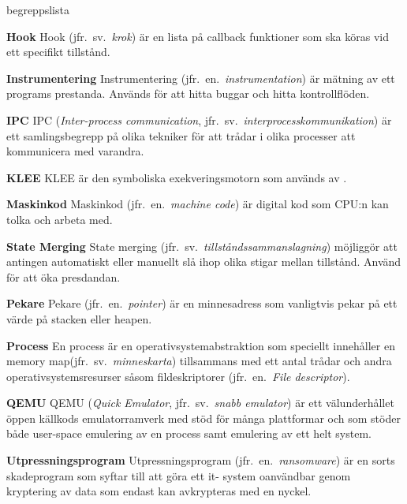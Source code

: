 \begin{labeling}{begreppslista}
    \item [\textbf{Hook}] Hook (jfr.\ sv.\ \emph{krok}) är en lista på callback
    funktioner som ska köras vid ett specifikt tillstånd.

    \item [\textbf{Instrumentering}] Instrumentering (jfr.\ en.\
    \emph{instrumentation}) är mätning av ett programs prestanda. Används för
    att hitta buggar och hitta kontrollflöden.

    \item [\textbf{IPC}] IPC (\emph{Inter-process communication}, jfr.\ sv.\
    \emph{interprocesskommunikation}) är ett samlingsbegrepp på olika tekniker
    för att trådar i olika processer att kommunicera med varandra.

    \item [\textbf{KLEE}] KLEE är den symboliska exekveringsmotorn som används
    av \stoe{}.

    \item [\textbf{Maskinkod}] Maskinkod (jfr.\ en.\ \emph{machine code}) är
    digital kod som CPU:n kan tolka och arbeta med.

    \item [\textbf{State Merging}] State merging (jfr.\ sv.\
    \emph{tillståndssammanslagning}) möjliggör att antingen automatiskt
    eller manuellt slå ihop olika stigar mellan tillstånd. Använd för att öka
    presdandan.

    \item [\textbf{Pekare}] Pekare (jfr.\ en.\ \emph{pointer}) är en minnesadress som
    vanligtvis pekar på ett värde på stacken eller heapen.

    \item [\textbf{Process}] En process är en
    operativsystemabstraktion som speciellt innehåller en memory
    map(jfr.\ sv.\ \emph{minneskarta}) tillsammans med ett antal trådar och
    andra operativsystemsresurser såsom fildeskriptorer (jfr.\
    en.\ \emph{File descriptor}).

    \item [\textbf{QEMU}] QEMU (\emph{Quick Emulator}, jfr.\ sv.\ \emph{snabb
        emulator}) är ett välunderhållet öppen källkods emulatorramverk
    med stöd för många plattformar och som stöder både user-space
    emulering av en process samt emulering av ett helt system.

    \item [\textbf{Utpressningsprogram}] Utpressningsprogram (jfr.\ en.\
    \emph{ransomware}) är en sorts skadeprogram som syftar till att göra ett it-
    system oanvändbar genom kryptering av data som endast kan avkrypteras med
    en nyckel.


\end{labeling}
